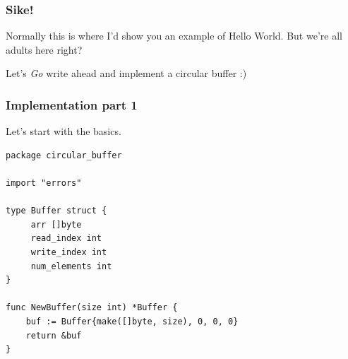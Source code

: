 \documentclass{beamer}
\begin{document}
\begin{frame}
\frametitle{Sike!}

Normally this is where I'd show you an example of Hello World. But we're all adults here right?

\vspace{0.5cm}

Let's \textit{Go} write ahead and implement a circular buffer :)

\vspace{0.5cm}


\end{frame}


\begin{frame}[fragile]
\frametitle{Implementation part 1}

Let's start with the basics.

\begin{lstlisting}
package circular_buffer

import "errors"

type Buffer struct {
	 arr []byte
	 read_index int
	 write_index int
	 num_elements int
}

func NewBuffer(size int) *Buffer {
	buf := Buffer{make([]byte, size), 0, 0, 0}
	return &buf
}
\end{lstlisting}
\end{frame}

\end{document}
